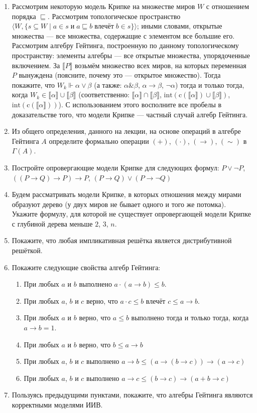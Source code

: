 \documentclass[10pt,a4paper,oneside]{article}
\begin{document}
\begin{enumerate}
\item Рассмотрим некоторую модель Крипке на множестве миров $W$ с отношением
порядка $\sqsubseteq$. Рассмотрим топологическое пространство
$\langle W, \{s\subseteq W \mid a \in s \;\textrm{и}\; a \sqsubseteq b \;\textrm{влечёт}\; b \in s\}\rangle$;
иными словами, открытые множества --- все множества, содержащие с элементом все большие его.
Рассмотрим алгебру Гейтинга, построенную по данному топологическому пространству:
элементы алгебры --- все открытые множества, упорядоченные включением.
За $\llbracket P \rrbracket$ возьмём множество всех миров, на которых переменная $P$ вынуждена
(поясните, почему это --- открытое множество).
Тогда покажите, что $W_k \Vdash \alpha \vee \beta$ (а также: $\alpha\&\beta$, $\alpha\rightarrow\beta$,
$\neg\alpha$) тогда и только тогда, когда
$W_k \in \llbracket \alpha \rrbracket \cup \llbracket \beta \rrbracket$
(соответственно: $\llbracket\alpha\rrbracket\cap\llbracket \beta \rrbracket$,
$\mathrm{int}(\mathrm{c}(\llbracket\alpha\rrbracket)\cup\llbracket \beta \rrbracket)$,
$\mathrm{int}(\mathrm{c}(\llbracket\alpha\rrbracket))$).
С использованием этого восполните все пробелы в доказательстве 
того, что модели Крипке --- частный случай алгебр Гейтинга.
\item Из общего определения, данного на лекции, на основе операций в алгебре Гейтинга $A$ 
определите формально операции $(+)$, $(\cdot)$, $(\rightarrow)$, $(\sim)$ в $\Gamma(A)$.
\item Постройте опровергающие модели Крипке для следующих формул:
$P\vee\neg P$, $((P\rightarrow Q)\rightarrow P)\rightarrow P$, 
$(P\rightarrow Q)\vee(P\rightarrow\neg Q)$
\item Будем рассматривать модели Крипке, в которых отношения между мирами образуют дерево
(у двух миров не бывает одного и того же потомка). Укажите формулу, для которой не 
существует опровергающей модели Крипке с глубиной дерева меньше $2$, $3$, $n$.
\item Покажите, что любая импликативная решётка является дистрибутивной решёткой.
\item Покажите следующие свойства алгебр Гейтинга:
\begin{enumerate}
\item При любых $a$ и $b$ выполнено $a\cdot (a\rightarrow b) \le b$.
\item При любых $a$, $b$ и $c$ верно, что $a\cdot c \le b$ влечёт $c \le a \rightarrow b$.
\item При любых $a$ и $b$ верно, что $a \le b$ выполнено тогда и только тогда, когда $a \rightarrow b = 1$.
\item При любых $a$ и $b$ верно, что $b \le a \rightarrow b$
\item При любых $a$, $b$ и $c$ выполнено $a\rightarrow b \le (a\rightarrow (b \rightarrow c)) \rightarrow (a\rightarrow c)$
\item При любых $a$, $b$ и $c$ выполнено $a\rightarrow c \le (b\rightarrow c) \rightarrow (a+b \rightarrow c)$
\end{enumerate}
\item Пользуясь предыдущими пунктами, покажите, что алгебры Гейтинга являются 
корректными моделями ИИВ.
\end{enumerate}
\end{document}
